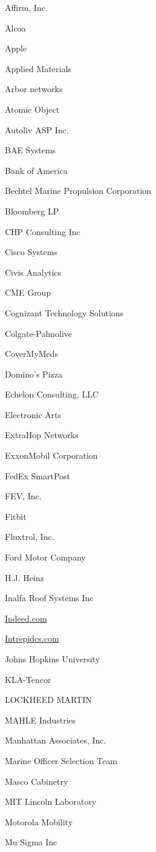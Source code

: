\documentclass[twoside]{article}
\begin{document}
\begin{center}
\begin{multicols}{5}
\begin{FlushLeft}
\begin{compactitem}
\item Affirm, Inc.
\item Alcoa
\item Apple
\item Applied Materials
\item Arbor networks
\item Atomic Object
\item Autoliv ASP Inc.
\item BAE Systems
\item Bank of America
\item Bechtel Marine Propulsion Corporation
\item Bloomberg LP
\item CHP Consulting Inc
\item Cisco Systems
\item Civis Analytics
\item CME Group
\item Cognizant Technology Solutions
\item Colgate-Palmolive
\item CoverMyMeds
\item Domino's Pizza
\item Echelon Consulting, LLC
\item Electronic Arts
\item ExtraHop Networks
\item ExxonMobil Corporation
\item FedEx SmartPost
\item FEV, Inc.
\item Fitbit
\item Fluxtrol, Inc.
\item Ford Motor Company
\item H.J. Heinz
\item Inalfa Roof Systems Inc
\item \url{Indeed.com}
\item \url{Intrepidcs.com}
\item Johns Hopkins University
\item KLA-Tencor
\item LOCKHEED MARTIN
\item MAHLE Industries
\item Manhattan Associates, Inc.
\item Marine Officer Selection Team
\item Masco Cabinetry
\item MIT Lincoln Laboratory
\item Motorola Mobility
\item Mu Sigma Inc

\end{compactitem}
\end{FlushLeft}
\end{multicols}
\end{center}
\end{document}
